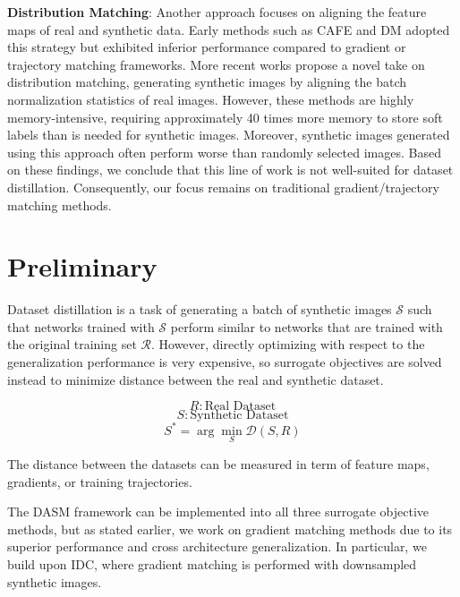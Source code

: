 \documentclass{article}
\theoremstyle{plain}
\theoremstyle{definition}
\theoremstyle{remark}
\begin{document}
\textbf{Distribution Matching}: Another approach focuses on aligning the feature maps of real and synthetic data. Early methods such as CAFE and DM adopted this strategy but exhibited inferior performance compared to gradient or trajectory matching frameworks. More recent works propose a novel take on distribution matching, generating synthetic images by aligning the batch normalization statistics of real images. However, these methods are highly memory-intensive, requiring approximately 40 times more memory to store soft labels than is needed for synthetic images. Moreover, synthetic images generated using this approach often perform worse than randomly selected images. Based on these findings, we conclude that this line of work is not well-suited for dataset distillation. Consequently, our focus remains on traditional gradient/trajectory matching methods.



\section{Preliminary}

Dataset distillation is a task of generating a batch of synthetic images $\mathcal{S}$ such that networks trained with $\mathcal{S}$ perform similar to networks that are trained with the original training set $\mathcal{R}$. However, directly optimizing with respect to the generalization performance is very expensive, so surrogate objectives are solved instead to minimize distance between the real and synthetic dataset.

\begin{equation}
R: \text{Real Dataset}
\end{equation}
\begin{equation}
S: \text{Synthetic Dataset}
\end{equation}
\begin{equation}
S^* = \arg \min_{S} \mathcal{D}(S,R)
\end{equation}

The distance between the datasets can be measured in term of feature maps, gradients, or training trajectories. 

The  DASM framework can be implemented into all three surrogate objective methods, but as stated earlier, we work on gradient matching methods due to its superior performance and cross architecture generalization. In particular, we build upon IDC, where gradient matching is performed with downsampled synthetic images.
\end{document}
